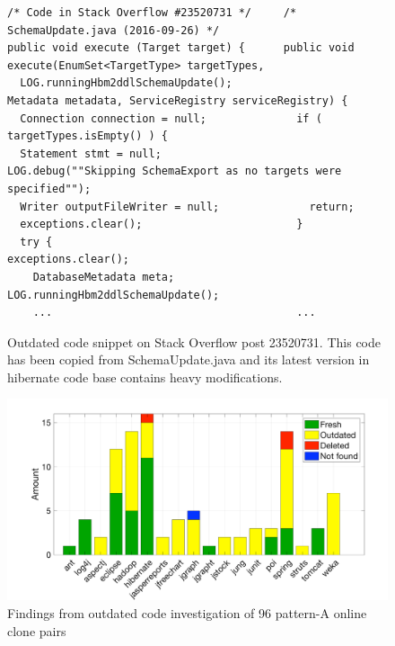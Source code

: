 \documentclass{sig-alternate-05-2015}
\begin{document}
\begin{figure}
	\begin{lstlisting}
/* Code in Stack Overflow #23520731 */     /* SchemaUpdate.java (2016-09-26) */
public void execute (Target target) {      public void execute(EnumSet<TargetType> targetTypes, 
  LOG.runningHbm2ddlSchemaUpdate();                        Metadata metadata, ServiceRegistry serviceRegistry) {
  Connection connection = null;              if ( targetTypes.isEmpty() ) {
  Statement stmt = null;                       LOG.debug(""Skipping SchemaExport as no targets were specified"");
  Writer outputFileWriter = null;              return;
  exceptions.clear();                        }
  try {                                      exceptions.clear();
    DatabaseMetadata meta;                   LOG.runningHbm2ddlSchemaUpdate();
    ...                                      ...
	\end{lstlisting}
	\caption{Outdated code snippet on Stack Overflow post 23520731. This code has been copied from SchemaUpdate.java and its latest version in hibernate code base contains heavy modifications.}
	\label{fig:hibernate_outdated_code}
\end{figure}

\begin{figure}
	\centering
	\includegraphics[width=0.8\linewidth]{outdated}
	\caption{Findings from outdated code investigation of 96 pattern-A online clone pairs}
	\label{fig:outdated}
\end{figure}
\end{document}
